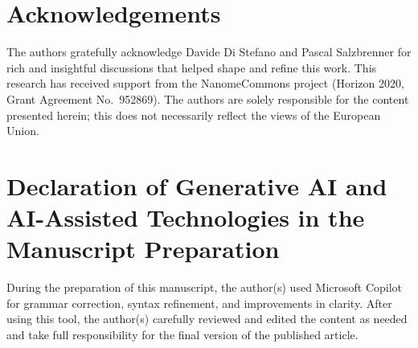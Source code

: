 \documentclass[final,3p,times]{elsarticle}
\begin{document}
\section*{Acknowledgements}

The authors gratefully acknowledge Davide Di Stefano and Pascal Salzbrenner for rich and insightful discussions that helped shape and refine this work. This research has received support from the NanomeCommons project (Horizon 2020, Grant Agreement No.~952869). The authors are solely responsible for the content presented herein; this does not necessarily reflect the views of the European Union.

\section*{Declaration of Generative AI and AI-Assisted Technologies in the Manuscript Preparation}

During the preparation of this manuscript, the author(s) used Microsoft Copilot for grammar correction, syntax refinement, and improvements in clarity. After using this tool, the author(s) carefully reviewed and edited the content as needed and take full responsibility for the final version of the published article.



\end{document}
